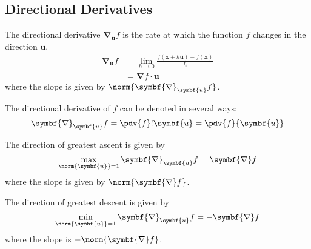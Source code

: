 \documentclass{article}
\begin{document}
\subsection{Directional Derivatives}
\begin{definition}
    The directional derivative \(\symbf{\nabla}_{\symbf{u}}f\) is the
    rate at which the function \(f\) changes in the direction
    \(\symbf{u}\).
    \begin{align*}
        \symbf{\nabla}_{\symbf{u}}f & = \lim_{h \to 0} \frac{f\left( \symbf{x} + h\symbf{u} \right) - f\left( \symbf{x} \right)}{h} \\
                                    & = \symbf{\nabla}f \cdot \symbf{u}
    \end{align*}
    where the slope is given by \(\norm{\symbf{\nabla}_{\symbf{u}}f}\).
\end{definition}
\begin{remark}
    The directional derivative of \(f\) can be denoted in several ways:
    \begin{equation*}
        \symbf{\nabla}_{\symbf{u}}f = \pdv{f}!{\symbf{u}} = \pdv{f}{\symbf{u}}
    \end{equation*}
\end{remark}
\begin{theorem}
    The direction of greatest ascent is given by
    \begin{equation*}
        \max_{\norm{\symbf{u}} = 1} \symbf{\nabla}_{\symbf{u}}f = \symbf{\nabla}f
    \end{equation*}
    where the slope is given by \(\norm{\symbf{\nabla}f}\).
\end{theorem}
\begin{theorem}
    The direction of greatest descent is given by
    \begin{equation*}
        \min_{\norm{\symbf{u}} = 1} \symbf{\nabla}_{\symbf{u}}f = -\symbf{\nabla}f
    \end{equation*}
    where the slope is \(-\norm{\symbf{\nabla}f}\).
\end{theorem}
\end{document}
